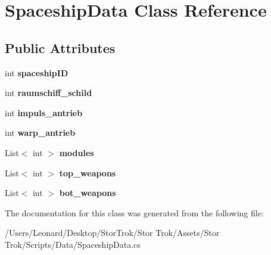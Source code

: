 \hypertarget{class_spaceship_data}{}\section{Spaceship\+Data Class Reference}
\label{class_spaceship_data}
\subsection*{Public Attributes}
\begin{DoxyCompactItemize}
\item 
\mbox{\label{class_spaceship_data_a637e046706bc8b65e4d88b1e76c70b2b}} 
int {\bfseries spaceship\+ID}
\item 
\mbox{\label{class_spaceship_data_ae045a6096fcc673440b5c9b056eb9e46}} 
int {\bfseries raumschiff\+\_\+schild}
\item 
\mbox{\label{class_spaceship_data_a198e6170d172a7d239978cf473fa7c90}} 
int {\bfseries impuls\+\_\+antrieb}
\item 
\mbox{\label{class_spaceship_data_a0de3878afe9136383863263c6ae793a6}} 
int {\bfseries warp\+\_\+antrieb}
\item 
\mbox{\label{class_spaceship_data_aba8f416cab5b8976d7611ad0e6be7d43}} 
List$<$ int $>$ {\bfseries modules}
\item 
\mbox{\label{class_spaceship_data_a78d843b491393d367c2ceebf8bbce676}} 
List$<$ int $>$ {\bfseries top\+\_\+weapons}
\item 
\mbox{\label{class_spaceship_data_a632d092d7ffc6066cba76ff7ecdeeaaf}} 
List$<$ int $>$ {\bfseries bot\+\_\+weapons}
\end{DoxyCompactItemize}


The documentation for this class was generated from the following file\+:\begin{DoxyCompactItemize}
\item 
/\+Users/\+Leonard/\+Desktop/\+Stor\+Trok/\+Stor Trok/\+Assets/\+Stor Trok/\+Scripts/\+Data/Spaceship\+Data.\+cs\end{DoxyCompactItemize}
